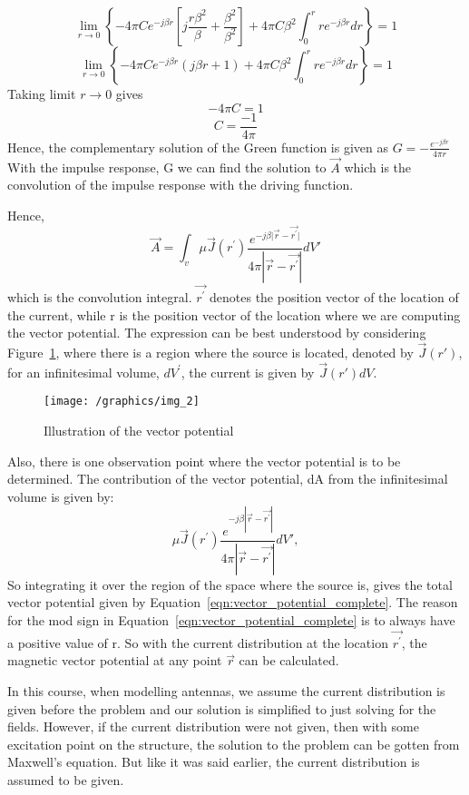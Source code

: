 \begin{dmath*}
\lim\limits_{r\rightarrow0} \left\lbrace-4\pi C e^{-j\beta r}\left[j\frac{r\beta^{2}}{\beta} +\frac{\beta^{2}}{\beta^{2}}\right] + 4\pi C\beta^{2}\int_{0}^{r}re^{-j\beta r}dr\right\rbrace = 1
\end{dmath*}
\begin{dmath*}
\lim\limits_{r\rightarrow0} \left\lbrace-4\pi C e^{-j\beta r}(j\beta r+1) + 4\pi C\beta^{2}\int_{0}^{r}re^{-j\beta r}dr\right\rbrace = 1
\end{dmath*}
Taking limit $r\rightarrow0$ gives
$$-4\pi C= 1$$
$$C = \frac{-1}{4\pi}$$
Hence, the complementary solution of the Green function is given as $ G= -\frac{e^{-j\beta r}}{4\pi r}$
With the impulse response, G we can find the solution to $\vec{A}$ which is the convolution of the impulse response with the driving function.

Hence, 
\begin{equation}
\vec{A}=\int_{v}\mu\vec{J}(r^{'}) \frac{e^{-j\beta\vert\vec{r}-\vec{r^{'}}\vert}}{4\pi|\vec{r}-\vec{r^{'}}|}dV'
\label{eqn:vector_potential_complete}
\end{equation}
which is the convolution integral. $\vec{r^{'}}$ denotes the position vector of the location of the current, while r is the position vector of the location where we are computing the vector potential. The expression can be best understood by considering Figure~\ref{fig:img_2}, where there is a region where the source is located, denoted by $\vec{J}(r')$, for an infinitesimal volume, $dV^{'}$, the current is given by $\vec{J}(r')dV$.
\begin{figure}[h]
\centering
\texttt{[image: /graphics/img\_2]}
\caption{Illustration of the vector potential}
\label{fig:img_2}
\end{figure}

Also, there is one observation point where the vector potential is to be determined. The contribution of the vector potential, dA from the infinitesimal volume is given by: 
\begin{equation}
\mu\vec{J}(r^{'}) \frac{e^{-j\beta|\vec{r}-\vec{r^{'}}|}}{4\pi|\vec{r}-\vec{r^{'}}|}dV',
\end{equation}
So integrating it over the region of the space where the source is, gives the total vector potential given by Equation~\eqref{eqn:vector_potential_complete}. The reason for the mod sign in Equation~\eqref{eqn:vector_potential_complete} is to always have a positive value of r. So with the current distribution at the location $\vec{r^{'}}$, the magnetic vector potential at any point $\vec{r}$ can be calculated.

In this course, when modelling antennas, we assume the current distribution is given before the problem and our solution is simplified to just solving for the fields. However, if the current distribution were not given, then with some excitation point on the structure, the solution to the problem can be gotten from Maxwell's equation. But like it was said earlier, the current distribution is assumed to be given.
